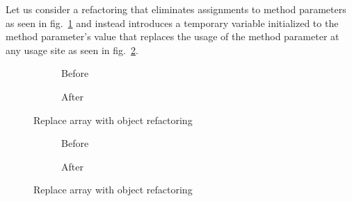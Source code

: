 Let us consider a refactoring that eliminates assignments to method parameters as seen in fig.~\ref{refa:RemoveAssignment-java-before} and instead introduces a temporary variable initialized to the method parameter's value that replaces the usage of the method parameter at any usage site as seen in fig.~\ref{refa:RemoveAssignment-java-after}.

\begin{figure}
  \begin{subfigure}[h]{.45\linewidth}
    
    \caption{Before}
    \label{refa:RemoveAssignment-java-before}    
  \end{subfigure}\hspace{1cm}
  \begin{subfigure}[h]{.45\linewidth}
    
    \caption{After}
    \label{refa:RemoveAssignment-java-after}
  \end{subfigure}
  \caption{Replace array with object refactoring}
  \label{refa:RemovAssignment-java}
\end{figure}


\begin{figure}
  \begin{subfigure}[h]{.45\linewidth}
    
    \caption{Before}
    \label{refa:RemoveAssignment-refinity-before}    
  \end{subfigure}\hspace{1cm}
  \begin{subfigure}[h]{.45\linewidth}
    
    \caption{After}
    \label{refa:RemoveAssignment-refinity-after}
  \end{subfigure}
  \caption{Replace array with object refactoring}
  \label{refa:RemovAssignment-refinity}
\end{figure}
